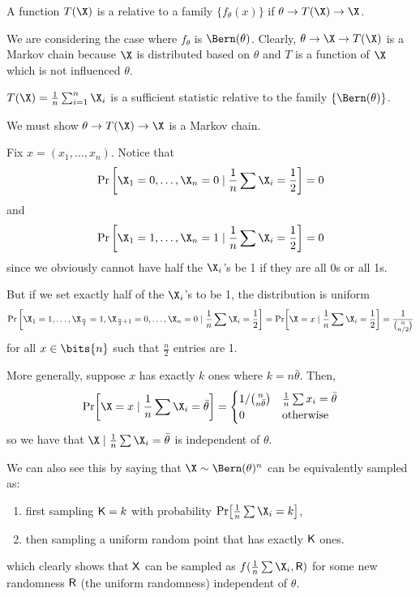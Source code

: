\documentclass[class=co432,notes,tikz]{agony}
\begin{document}
\begin{defn}
  A function $T(\X)$ is a 
  relative to a family $\{f_\theta(x)\}$ if $\theta \to T(\X) \to \X$.
\end{defn}

We are considering the case where $f_\theta$ is $\Bern(\theta)$.
Clearly, $\theta \to \X \to T(\X)$ is a Markov chain
because $\X$ is distributed based on $\theta$ and $T$ is a function of
$\X$ which is not influenced $\theta$.

\begin{example}
  $T(\X) = \frac1n\sum_{i=1}^n \X_i$ is a sufficient statistic
  relative to the family $\{\Bern(\theta)\}$.
\end{example}
\begin{prf}
  We must show $\theta \to T(\X) \to \X$ is a Markov chain.

  Fix $x = (x_1,\dotsc,x_n)$. Notice that
  \[ \Pr\qty[\X_1=0,\dotsc,\X_n=0 \mid \frac1n\sum \X_i = \frac12] = 0 \]
  and
  \[ \Pr\qty[\X_1=1,\dotsc,\X_n=1 \mid \frac1n\sum \X_i = \frac12] = 0 \]
  since we obviously cannot have half the $\X_i$'s be 1 if they are all 0s or all 1s.

  But if we set exactly half of the $\X_i$'s to be 1, the distribution is uniform
  \[ \Pr\qty[\X_1=1,\dotsc,\X_{\frac{n}{2}}=1,\X_{\frac{n}{2}+1}=0,\dotsc,\X_n=0 \mid \frac1n\sum\X_i = \frac12] = \Pr[\X=x \mid \frac1n\sum\X_i = \frac12] = \frac{1}{\binom{n}{n/2}} \]
  for all $x\in\bits{n}$ such that $\frac{n}{2}$ entries are 1.

  More generally, suppose $x$ has exactly $k$ ones where $k = n\bar\theta$. Then,
  \[
    \Pr[\X=x \mid \frac1n\sum\X_i = \bar\theta] = \begin{cases}
      1/\binom{n}{n\bar\theta} & \frac1n\sum x_i = \bar\theta \\
      0                        & \text{otherwise}
    \end{cases}
  \]
  so we have that $\X \mid \frac1n\sum\X_i = \bar\theta$ is independent of $\theta$.

  We can also see this by saying that $\X \sim \Bern(\theta)^n$
  can be equivalently sampled as:
  \begin{enumerate}
    \item first sampling $\mathsf K = k$ with probability $\Pr[\frac1n\sum\X_i=k]$,
    \item then sampling a uniform random point that has exactly $\mathsf K$ ones.
  \end{enumerate}
  which clearly shows that $\mathsf X$ can be sampled as $f(\frac1n\sum\X_i,\rv R)$
  for some new randomness $\mathsf R$ (the uniform randomness) independent of $\theta$. 
\end{prf}
\end{document}
